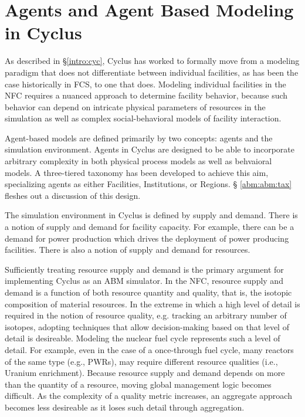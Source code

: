 
\section{Agents and Agent Based Modeling in Cyclus}\label{abm:abm}

As described in \S \ref{intro:cyc}, Cyclus has worked to formally move from a
modeling paradigm that does not differentiate between individual facilities, as
has been the case historically in FCS, to one that does. Modeling individual
facilities in the NFC requires a nuanced approach to determine facility
behavior, because such behavior can depend on intricate physical parameters of
resources in the simulation as well as complex social-behavioral models of
facility interaction. 

Agent-based models are defined primarily by two concepts: agents and the
simulation environment. Agents in Cyclus are designed to be able to incorporate
arbitrary complexity in both physical process models as well as behvaioral
models. A three-tiered taxonomy has been developed to achieve this aim,
specializing agents as either Facilities, Institutions, or Regions. \S
\ref{abm:abm:tax} fleshes out a discussion of this design.

The simulation environment in Cyclus is defined by supply and demand. There is a
notion of supply and demand for facility capacity. For example, there can be a
demand for power production which drives the deployment of power producing
facilities. There is also a notion of supply and demand for resources. 

Sufficiently treating resource supply and demand is the primary argument for
implementing Cyclus as an ABM simulator. In the NFC, resource supply and demand
is a function of both resource quantity and quality, that is, the isotopic
composition of material resources. In the extreme in which a high level of
detail is required in the notion of resource quality, e.g. tracking an arbitrary
number of isotopes, adopting techniques that allow decision-making based on that
level of detail is desireable. Modeling the nuclear fuel cycle represents such a
level of detail. For example, even in the case of a once-through fuel cycle,
many reactors of the same type (e.g., PWRs), may require different resource
qualities (i.e., Uranium enrichment). Because resource supply and demand depends
on more than the quantity of a resource, moving global management logic becomes
difficult. As the complexity of a quality metric increases, an aggregate
approach becomes less desireable as it loses such detail through aggregation.

